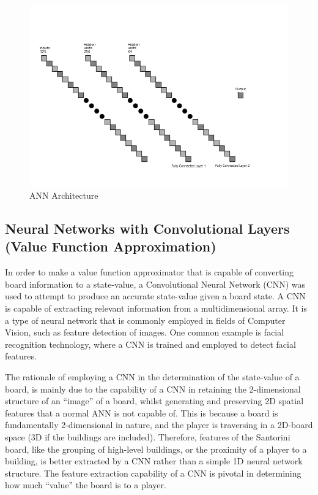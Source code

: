 \documentclass[a4paper,12pt,table]{article}
\begin{document}
\begin{figure}[H]
    \begin{center}
        \includegraphics[scale=0.65]{ANN_Architecture.jpg}
        \caption{ANN Architecture}
        \label{fig:}
    \end{center}
\end{figure}


\subsection{Neural Networks with Convolutional Layers (Value Function Approximation)}

In order to make a value function approximator that is capable of converting board information to a state-value, a Convolutional Neural Network (CNN) was used to attempt to produce an accurate state-value given a board state. A CNN is capable of extracting relevant information from a multidimensional array.  It is a type of neural network that is commonly employed in fields of Computer Vision, such as feature detection of images. One common example is facial recognition technology, where a CNN is trained and employed to detect facial features.   \par

The rationale of employing a CNN in the determination of the state-value of a board, is mainly due to the capability of a CNN in retaining the 2-dimensional structure of an “image” of a board, whilst generating and preserving 2D spatial features that a normal ANN is not capable of. This is because a board is fundamentally 2-dimensional in nature, and the player is traversing in a 2D-board space (3D if the buildings are included). Therefore, features of the Santorini board, like the grouping of high-level buildings, or the proximity of a player to a building, is better extracted by a CNN rather than a simple 1D neural network structure. The feature extraction capability of a CNN is pivotal in determining how much “value” the board is to a player. \par
\end{document}
